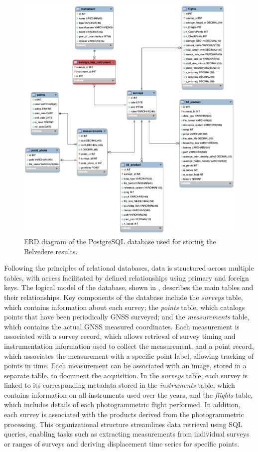 \begin{figure}[ht!]
  \centering
  \includegraphics[width=\textwidth]{belvederedb_erd.png}
  \caption{ERD diagram of the PostgreSQL database used for storing the Belvedere results.}
  \label{fig:3:belvederedb_erd}
\end{figure}

Following the principles of relational databases, data is structured across multiple tables, with access facilitated by defined relationships using primary and foreign keys. 
The logical model of the database, shown in , describes the main tables and their relationships.
Key components of the database include the \textit{surveys} table, which contains information about each survey; the \textit{points} table, which catalogs points that have been periodically GNSS surveyed; and the \textit{measurements} table, which contains the actual GNSS measured coordinates. 
Each measurement is associated with a survey record, which allows retrieval of survey timing and instrumentation information used to collect the measurement, and a point record, which associates the measurement with a specific point label, allowing tracking of points in time.
Each measurement can be associated with an image, stored in a separate table, to document the acquisition.
In the \textit{surveys} table, each survey is linked to its corresponding metadata stored in the \textit{instruments} table, which contains information on all instruments used over the years, and the \textit{flights} table, which includes details of each photogrammetric flight performed.
In addition, each survey is associated with the products derived from the photogrammetric processing.
This organizational structure streamlines data retrieval using SQL queries, enabling tasks such as extracting measurements from individual surveys or ranges of surveys and deriving displacement time series for specific points.

